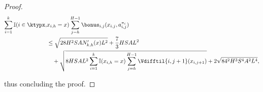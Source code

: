 \begin{proof}
\begin{align*}
    \sum_{i=1}^k \mathbb{I}(i \in \ktypx, &x_{i,h}=x) \sum_{j=h}^{H-1} \bonus_{i,j}(x_{i,j}, a_{i,j}^{\pi_i}) \\
    &\le \sqrt{28 H^2SA N'_{k,h}(x) L^2} + \frac{7}{3} HSAL^2 \\
    &\quad + \sqrt{8 HSAL^2 \sum_{i=1}^k \mathbb{I}(x_{i,h}=x) \sum_{j=h}^{H-1} \Vdifftil{i,j+1}(x_{i,j+1})} + 2 \sqrt{84^2 H^3 S^4 A^2 L^4},
\end{align*}

thus concluding the proof.

\end{proof}